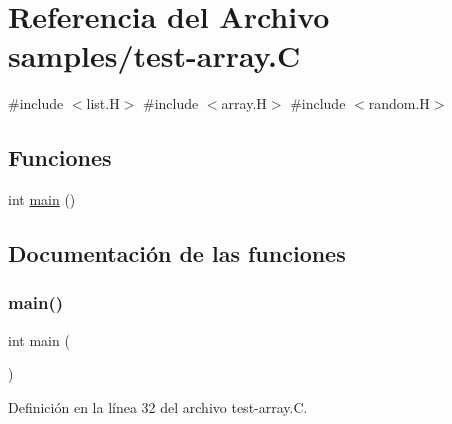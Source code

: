 \hypertarget{test-array_8_c}{}\section{Referencia del Archivo samples/test-\/array.C}
\label{test-array_8_c}
{\ttfamily \#include $<$list.\+H$>$}\newline
{\ttfamily \#include $<$array.\+H$>$}\newline
{\ttfamily \#include $<$random.\+H$>$}\newline
\subsection*{Funciones}
\begin{DoxyCompactItemize}
\item 
int \hyperlink{test-array_8_c_ae66f6b31b5ad750f1fe042a706a4e3d4}{main} ()
\end{DoxyCompactItemize}


\subsection{Documentación de las funciones}
\mbox{\label{test-array_8_c_ae66f6b31b5ad750f1fe042a706a4e3d4}} 
\subsubsection{\texorpdfstring{main()}{main()}}
{\footnotesize\ttfamily int main (\begin{DoxyParamCaption}{ }\end{DoxyParamCaption})}



Definición en la línea 32 del archivo test-\/array.\+C.


